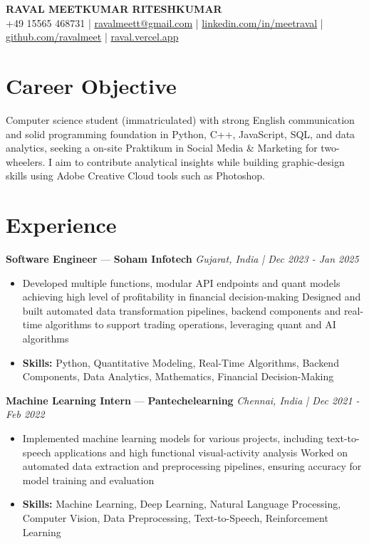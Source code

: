 \documentclass[a4paper,10pt]{article}
\begin{document}
\begin{center}
  {\Large\bfseries RAVAL MEETKUMAR RITESHKUMAR}\\[2pt]
  {\small +49 15565 468731 \;|\; \href{mailto:ravalmeett@gmail.com}{ravalmeett@gmail.com} \;|\; \href{https://www.linkedin.com/in/meetraval/}{linkedin.com/in/meetraval} \;|\; \href{https://github.com/ravalmeet}{github.com/ravalmeet} \;|\; \href{https://raval.vercel.app/}{raval.vercel.app}}
\end{center}
\vspace{-3pt}

\section*{Career Objective}
Computer science student (immatriculated) with strong English communication and solid programming foundation in Python, C++, JavaScript, SQL, and data analytics, seeking a on-site Praktikum in Social Media \& Marketing for two-wheelers. I aim to contribute analytical insights while building graphic-design skills using Adobe Creative Cloud tools such as Photoshop.\par

\section*{Experience}
\textbf{Software Engineer} — \textbf{Soham Infotech} \hfill \textit{Gujarat, India \;|\; Dec 2023 - Jan 2025}\par
\vspace{1pt}
\begin{itemize}
  \item Developed multiple functions, modular API endpoints and quant models achieving high level of profitability in financial decision-making Designed and built automated data transformation pipelines, backend components and real-time algorithms to support trading operations, leveraging quant and AI algorithms
  \item \textbf{Skills:} Python, Quantitative Modeling, Real-Time Algorithms, Backend Components, Data Analytics, Mathematics, Financial Decision-Making
\end{itemize}
\vspace{3pt}
\textbf{Machine Learning Intern} — \textbf{Pantechelearning} \hfill \textit{Chennai, India \;|\; Dec 2021 - Feb 2022}\par
\vspace{1pt}
\begin{itemize}
  \item Implemented machine learning models for various projects, including text-to-speech applications and high functional visual-activity analysis Worked on automated data extraction and preprocessing pipelines, ensuring accuracy for model training and evaluation
  \item \textbf{Skills:} Machine Learning, Deep Learning, Natural Language Processing, Computer Vision, Data Preprocessing, Text-to-Speech, Reinforcement Learning
\end{itemize}
\end{document}
